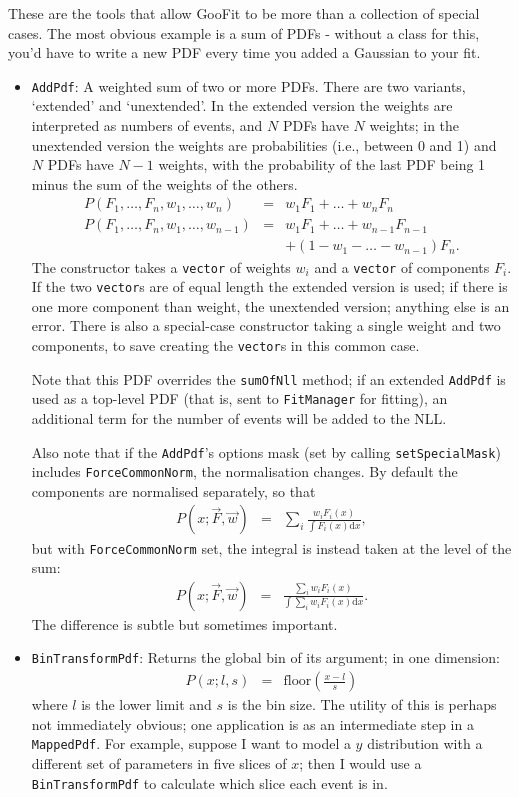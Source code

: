 \documentclass[12pt,pdflatex]{article}
\begin{document}
These are the tools that allow GooFit to be more than a collection
of special cases. The most obvious example is a sum of PDFs - without
a class for this, you'd have to write a new PDF every time you added a Gaussian
to your fit. 

\begin{itemize}
\item \texttt{AddPdf}: A weighted sum of two or more PDFs. There are two variants,
`extended' and `unextended'. In the extended version the weights are interpreted as numbers
of events, and $N$ PDFs have $N$ weights; in the unextended version the weights are probabilities
(i.e., between 0 and 1) and $N$ PDFs have $N-1$ weights, with the probability of the last PDF
being 1 minus the sum of the weights of the others. 
\begin{eqnarray}
P(F_1,\ldots, F_n,w_1,\ldots,w_n) &=& w_1F_1 + \ldots + w_nF_n \\
P(F_1,\ldots, F_n,w_1,\ldots,w_{n-1}) &=& 
w_1F_1 + \ldots + w_{n-1}F_{n-1}\\
&&+ (1 - w_1 - \ldots - w_{n-1})F_n.
\end{eqnarray}
The constructor takes a \texttt{vector} of weights $w_i$ and a \texttt{vector}
of components $F_i$. If the two \texttt{vector}s are of equal length the extended
version is used; if there is one more component than weight, the unextended version;
anything else is an error. There is also a special-case constructor taking a single
weight and two components, to save creating the \texttt{vector}s in this common case.

Note that this PDF overrides the \texttt{sumOfNll} method; if an extended \texttt{AddPdf}
is used as a top-level PDF (that is, sent to \texttt{FitManager} for fitting), an additional
term for the number of events will be added to the NLL.

Also note that if the \texttt{AddPdf}'s options mask (set by calling
\texttt{setSpecialMask}) includes \texttt{ForceCommonNorm}, the normalisation changes.
By default the components are normalised separately, so that
\begin{eqnarray}
P(x;\vec F, \vec w) &=& \sum\limits_i \frac{w_iF_i(x)}{\int F_i(x) \mathrm{d}x},
\end{eqnarray}
but with \texttt{ForceCommonNorm} set, the integral is instead taken at
the level of the sum:
\begin{eqnarray}
P(x;\vec F, \vec w) &=& \frac{\sum\limits_i w_iF_i(x)}{\int\sum\limits_i w_iF_i(x)\mathrm{d}x}.
\end{eqnarray}
The difference is subtle but sometimes important. 
\item \texttt{BinTransformPdf}: Returns the global bin of its argument; in one dimension:
\begin{eqnarray}
P(x;l,s) &=& \mathrm{floor}\left(\frac{x-l}{s}\right)
\end{eqnarray}
where $l$ is the lower limit and $s$ is the bin size. The utility of
this is perhaps not immediately obvious; one application is as an intermediate
step in a \texttt{MappedPdf}. For example, suppose I want to 
model a $y$ distribution with a different set of parameters in five slices
of $x$; then I would use a \texttt{BinTransformPdf} to calculate
which slice each event is in. 


\end{itemize}
\end{document}
